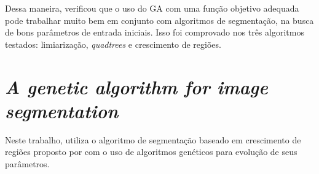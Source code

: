 \documentclass[12pt,oneside,a4paper,english,french,spanish,brazil,]{abntex2}
\begin{document}
Dessa maneira, \citet{matias:2007} verificou que o uso do GA com uma função objetivo adequada pode trabalhar muito bem em conjunto com algoritmos de segmentação, na busca de bons parâmetros de entrada iniciais. Isso foi comprovado nos três algoritmos testados: limiarização, \textit{quadtrees} e crescimento de regiões.

\section{\textit{A genetic algorithm for image segmentation}}


Neste trabalho, \citet{bosco:2001} utiliza o algoritmo de segmentação baseado em crescimento de regiões proposto por \citet{gesu:1988} com o uso de algoritmos genéticos para evolução de seus parâmetros. 
\end{document}
